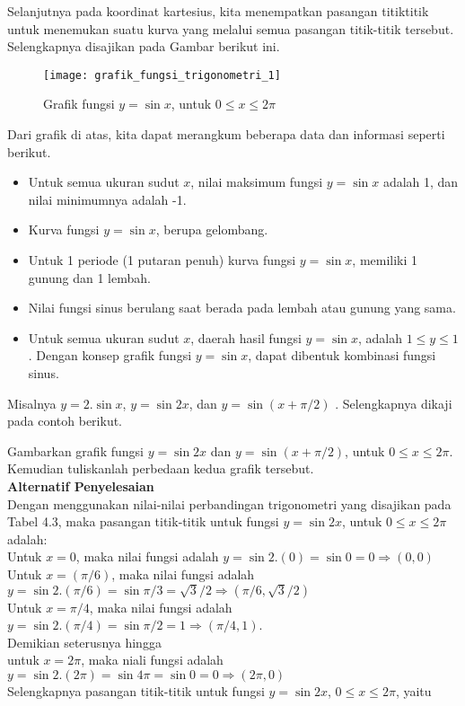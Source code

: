 \documentclass[11pt,fleqn]{book} %
\begin{document}
\begin{myEnumerate}
\begin{itemize}
\begin{enumerate}
Selanjutnya pada koordinat kartesius, kita menempatkan pasangan titiktitik untuk menemukan suatu kurva  yang melalui semua pasangan titik-titik tersebut. Selengkapnya disajikan pada Gambar berikut ini.\\

\begin{figure}[!ht]
\begin{center}
\texttt{[image: grafik\_fungsi\_trigonometri\_1]}
\caption{Grafik fungsi $y = \sin x$, untuk $0 \leq x\leq 2\pi$}
\end{center}
\end{figure}

Dari grafik di atas,  kita dapat merangkum beberapa data dan informasi seperti berikut.
\begin{itemize}
\item Untuk semua ukuran sudut $x$,  nilai maksimum fungsi $y = \sin x$ adalah 1, dan nilai minimumnya adalah -1.
\item Kurva fungsi $y = \sin x$, berupa gelombang.
\item Untuk 1 periode (1 putaran penuh) kurva fungsi $y = \sin x$, memiliki 1 gunung dan 1 lembah.
\item Nilai fungsi sinus berulang saat berada pada lembah atau gunung yang sama.
\item Untuk semua ukuran sudut $x$, daerah hasil fungsi $y = \sin x$, adalah $1 \leq y \leq 1$. Dengan konsep grafik fungsi $y = \sin x$, dapat dibentuk kombinasi fungsi sinus.
\end{itemize}

Misalnya $y = 2.\sin x$, $y = \sin 2x$, dan $y = \sin (x+\pi/2)$ . Selengkapnya dikaji pada contoh berikut.

\begin{example}
Gambarkan grafik fungsi $y = \sin 2x$ dan $y = \sin (x+\pi/2)$, untuk $0 \leq x\leq 2\pi$. Kemudian tuliskanlah perbedaan kedua grafik tersebut.\\

\textbf{Alternatif Penyelesaian}\\
Dengan menggunakan nilai-nilai perbandingan trigonometri yang disajikan pada Tabel 4.3, maka pasangan titik-titik untuk fungsi $y = \sin 2x$, untuk $0 \leq x\leq 2\pi$ adalah:\\
Untuk $x = 0$, maka nilai fungsi adalah $y = \sin 2.(0) = \sin 0 = 0 \Rightarrow (0, 0)$\\
Untuk $x = (\pi/6)$, maka nilai fungsi adalah $y = \sin 2. (\pi/6) = \sin \pi/3 = \sqrt{3}/2 \Rightarrow(\pi/6,\sqrt{3}/2)$\\
Untuk $x = \pi/4$, maka nilai fungsi adalah $y = \sin 2. (\pi/4) = \sin \pi/2 = 1 \Rightarrow(\pi/4,1)$.\\
Demikian seterusnya hingga\\
untuk $x = 2\pi$, maka niali fungsi adalah $y = \sin 2.(2\pi) = \sin 4\pi = \sin 0 = 0 \Rightarrow (2\pi, 0)$\\
Selengkapnya pasangan titik-titik untuk fungsi $y = \sin 2x$, $0 \leq x\leq 2\pi$, yaitu


\end{example}
\end{enumerate}
\end{itemize}
\end{myEnumerate}
\end{document}
